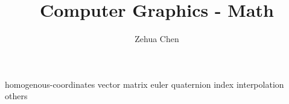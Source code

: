 \documentclass{../../shared/latex/notes}
\title{Computer Graphics - Math}
\author{Zehua Chen}
\begin{document}
  \maketitle
  \tableofcontents

  {homogenous-coordinates}
  {vector}
  {matrix}
  {euler}
  {quaternion}
  {index}
  {interpolation}
  {others}
\end{document}
